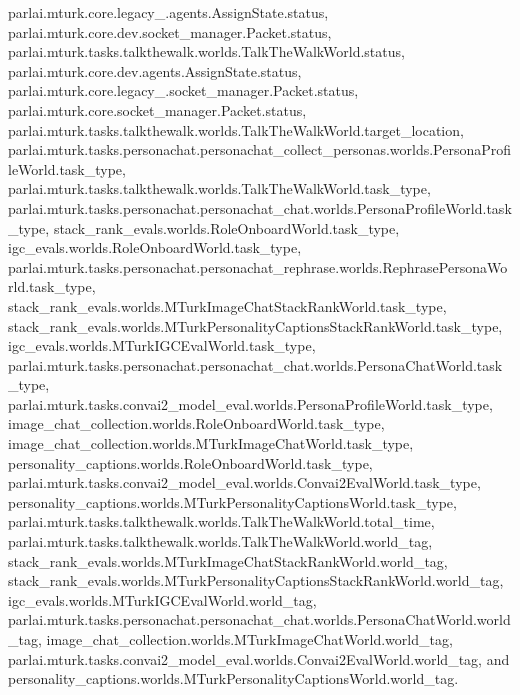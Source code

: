 parlai.\+mturk.\+core.\+legacy\+\_.\+agents.\+Assign\+State.\+status, parlai.\+mturk.\+core.\+dev.\+socket\+\_\+manager.\+Packet.\+status, parlai.\+mturk.\+tasks.\+talkthewalk.\+worlds.\+Talk\+The\+Walk\+World.\+status, parlai.\+mturk.\+core.\+dev.\+agents.\+Assign\+State.\+status, parlai.\+mturk.\+core.\+legacy\+\_.\+socket\+\_\+manager.\+Packet.\+status, parlai.\+mturk.\+core.\+socket\+\_\+manager.\+Packet.\+status, parlai.\+mturk.\+tasks.\+talkthewalk.\+worlds.\+Talk\+The\+Walk\+World.\+target\+\_\+location, parlai.\+mturk.\+tasks.\+personachat.\+personachat\+\_\+collect\+\_\+personas.\+worlds.\+Persona\+Profile\+World.\+task\+\_\+type, parlai.\+mturk.\+tasks.\+talkthewalk.\+worlds.\+Talk\+The\+Walk\+World.\+task\+\_\+type, parlai.\+mturk.\+tasks.\+personachat.\+personachat\+\_\+chat.\+worlds.\+Persona\+Profile\+World.\+task\+\_\+type, stack\+\_\+rank\+\_\+evals.\+worlds.\+Role\+Onboard\+World.\+task\+\_\+type, igc\+\_\+evals.\+worlds.\+Role\+Onboard\+World.\+task\+\_\+type, parlai.\+mturk.\+tasks.\+personachat.\+personachat\+\_\+rephrase.\+worlds.\+Rephrase\+Persona\+World.\+task\+\_\+type, stack\+\_\+rank\+\_\+evals.\+worlds.\+M\+Turk\+Image\+Chat\+Stack\+Rank\+World.\+task\+\_\+type, stack\+\_\+rank\+\_\+evals.\+worlds.\+M\+Turk\+Personality\+Captions\+Stack\+Rank\+World.\+task\+\_\+type, igc\+\_\+evals.\+worlds.\+M\+Turk\+I\+G\+C\+Eval\+World.\+task\+\_\+type, parlai.\+mturk.\+tasks.\+personachat.\+personachat\+\_\+chat.\+worlds.\+Persona\+Chat\+World.\+task\+\_\+type, parlai.\+mturk.\+tasks.\+convai2\+\_\+model\+\_\+eval.\+worlds.\+Persona\+Profile\+World.\+task\+\_\+type, image\+\_\+chat\+\_\+collection.\+worlds.\+Role\+Onboard\+World.\+task\+\_\+type, image\+\_\+chat\+\_\+collection.\+worlds.\+M\+Turk\+Image\+Chat\+World.\+task\+\_\+type, personality\+\_\+captions.\+worlds.\+Role\+Onboard\+World.\+task\+\_\+type, parlai.\+mturk.\+tasks.\+convai2\+\_\+model\+\_\+eval.\+worlds.\+Convai2\+Eval\+World.\+task\+\_\+type, personality\+\_\+captions.\+worlds.\+M\+Turk\+Personality\+Captions\+World.\+task\+\_\+type, parlai.\+mturk.\+tasks.\+talkthewalk.\+worlds.\+Talk\+The\+Walk\+World.\+total\+\_\+time, parlai.\+mturk.\+tasks.\+talkthewalk.\+worlds.\+Talk\+The\+Walk\+World.\+world\+\_\+tag, stack\+\_\+rank\+\_\+evals.\+worlds.\+M\+Turk\+Image\+Chat\+Stack\+Rank\+World.\+world\+\_\+tag, stack\+\_\+rank\+\_\+evals.\+worlds.\+M\+Turk\+Personality\+Captions\+Stack\+Rank\+World.\+world\+\_\+tag, igc\+\_\+evals.\+worlds.\+M\+Turk\+I\+G\+C\+Eval\+World.\+world\+\_\+tag, parlai.\+mturk.\+tasks.\+personachat.\+personachat\+\_\+chat.\+worlds.\+Persona\+Chat\+World.\+world\+\_\+tag, image\+\_\+chat\+\_\+collection.\+worlds.\+M\+Turk\+Image\+Chat\+World.\+world\+\_\+tag, parlai.\+mturk.\+tasks.\+convai2\+\_\+model\+\_\+eval.\+worlds.\+Convai2\+Eval\+World.\+world\+\_\+tag, and personality\+\_\+captions.\+worlds.\+M\+Turk\+Personality\+Captions\+World.\+world\+\_\+tag.

